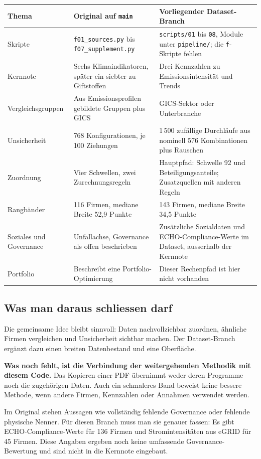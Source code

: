 \documentclass[11pt,a4paper]{article}
\begin{document}
\small
\begin{tabularx}{\linewidth}{@{}p{31mm}YY@{}}\toprule
Thema & Original auf \texttt{main} & Vorliegender Dataset-Branch\\\midrule
Skripte & \texttt{f01\_sources.py} bis \texttt{f07\_supplement.py} & \texttt{scripts/01} bis \texttt{08}, Module unter \texttt{pipeline/}; die \texttt{f}-Skripte fehlen\\
Kernnote & Sechs Klimaindikatoren, später ein siebter zu Giftstoffen & Drei Kennzahlen zu Emissionsintensität und Trends\\
Vergleichsgruppen & Aus Emissionsprofilen gebildete Gruppen plus GICS & GICS-Sektor oder Unterbranche\\
Unsicherheit & 768 Konfigurationen, je 100 Ziehungen & 1\,500 zufällige Durchläufe aus nominell 576 Kombinationen plus Rauschen\\
Zuordnung & Vier Schwellen, zwei Zurechnungsregeln & Hauptpfad: Schwelle 92 und Beteiligungsanteile; Zusatzquellen mit anderen Regeln\\
Rangbänder & 116 Firmen, mediane Breite 52,9 Punkte & 143 Firmen, mediane Breite 34,5 Punkte\\
Soziales und Governance & Unfallachse, Governance als offen beschrieben & Zusätzliche Sozialdaten und ECHO-Compliance-Werte im Dataset, ausserhalb der Kernnote\\
Portfolio & Beschreibt eine Portfolio-Optimierung & Dieser Rechenpfad ist hier nicht vorhanden\\\bottomrule
\end{tabularx}
\normalsize

\subsection*{Was man daraus schliessen darf}
Die gemeinsame Idee bleibt sinnvoll: Daten nachvollziehbar zuordnen, ähnliche Firmen vergleichen und Unsicherheit sichtbar machen. Der Dataset-Branch ergänzt dazu einen breiten Datenbestand und eine Oberfläche.

\textbf{Was noch fehlt, ist die Verbindung der weitergehenden Methodik mit diesem Code.} Das Kopieren einer PDF übernimmt weder deren Programme noch die zugehörigen Daten. Auch ein schmaleres Band beweist keine bessere Methode, wenn andere Firmen, Kennzahlen oder Annahmen verwendet werden.

Im Original stehen Aussagen wie vollständig fehlende Governance oder fehlende physische Nenner. Für diesen Branch muss man sie genauer fassen: Es gibt ECHO-Compliance-Werte für 136 Firmen und Stromintensitäten aus eGRID für 45 Firmen. Diese Angaben ergeben noch keine umfassende Governance-Bewertung und sind nicht in die Kernnote eingebaut.
\end{document}
